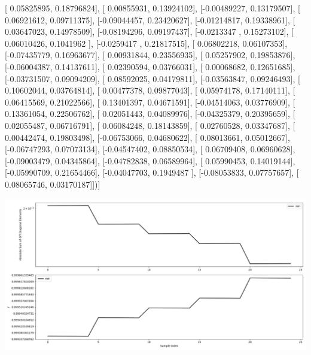 \documentclass{article}
\begin{document}
       [ 0.05825895,  0.18796824],
       [ 0.00855931,  0.13924102],
       [-0.00489227,  0.13179507],
       [ 0.06921612,  0.09711375],
       [-0.09044457,  0.23420627],
       [-0.01214817,  0.19338961],
       [ 0.03647023,  0.14978509],
       [-0.08194296,  0.09197437],
       [-0.0213347 ,  0.15273102],
       [ 0.06010426,  0.1041962 ],
       [-0.0259417 ,  0.21817515],
       [ 0.06802218,  0.06107353],
       [-0.07435779,  0.16963677],
       [ 0.00931844,  0.23556935],
       [ 0.05257902,  0.19853876],
       [-0.06004387,  0.14137611],
       [ 0.02390594,  0.03766031],
       [ 0.00068682,  0.12651685],
       [-0.03731507,  0.09094209],
       [ 0.08592025,  0.04179811],
       [-0.03563847,  0.09246493],
       [ 0.10602044,  0.03764814],
       [ 0.00477378,  0.09877043],
       [ 0.05974178,  0.17140111],
       [ 0.06415569,  0.21022566],
       [ 0.13401397,  0.04671591],
       [-0.04514063,  0.03776909],
       [ 0.13361054,  0.22506762],
       [ 0.02051443,  0.04089976],
       [-0.04325379,  0.20395659],
       [ 0.02055487,  0.06716791],
       [ 0.06084248,  0.18143859],
       [ 0.02760528,  0.03347687],
       [ 0.00442474,  0.19803498],
       [-0.06753066,  0.04680622],
       [ 0.08013661,  0.05012667],
       [-0.06747293,  0.07073134],
       [-0.04547402,  0.08850534],
       [ 0.06709408,  0.06960628],
       [-0.09003479,  0.04345864],
       [-0.04782838,  0.06589964],
       [ 0.05990453,  0.14019144],
       [-0.05990709,  0.21654466],
       [-0.04047703,  0.1949487 ],
       [-0.08053833,  0.07757657],
       [ 0.08065746,  0.03170187]])]
\begin{center}
\includegraphics[scale=.9]{report_pickled_controls194/control_dpn_all.png}

\end{center}
\end{document}
